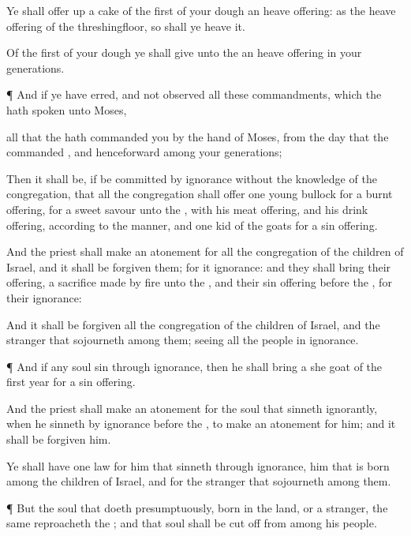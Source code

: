 {Ye shall offer
up a
cake of the
first of your
dough
{} an heave
offering: as
{} the heave
offering of the
threshingfloor, so shall ye
heave it.

Of the
first of your
dough ye shall
give unto the
{} an heave
offering in your
generations.


\par }{\PP {}¶ And if ye have
erred, and not
observed all these
commandments, which the
{} hath
spoken unto
Moses,

 all that the
{} hath
commanded you by the
hand of
Moses, from the
day that the
{}
commanded
{}, and
henceforward among your
generations;

Then it shall be, if
{} be
committed by
ignorance without the
knowledge of the
congregation, that all the
congregation shall
offer
one
young
bullock for a burnt
offering, for a
sweet
savour unto the
{}, with his meat
offering, and his drink
offering, according to the
manner, and
one
kid of the
goats for a sin
offering.

And the
priest shall make an
atonement for all the
congregation of the
children of
Israel, and it shall be
forgiven them; for it
{}
ignorance: and they shall
bring their
offering, a sacrifice made by
fire unto the
{}, and their sin
offering
before the
{}, for their
ignorance:

And it shall be
forgiven all the
congregation of the
children of
Israel, and the
stranger that
sojourneth
among them; seeing all the
people
{} in
ignorance.


\par }{\PP {}¶ And if
any
soul
sin through
ignorance, then he shall
bring a she
goat of the
first
year for a sin
offering.

And the
priest shall make an
atonement for the
soul that sinneth
ignorantly, when he
sinneth by
ignorance
before the
{}, to make an
atonement for him; and it shall be
forgiven him.

Ye shall have
one
law for him that
sinneth through
ignorance,
{} him that is
born among the
children of
Israel, and for the
stranger that
sojourneth
among them.


\par }{\PP {}¶ But the
soul that
doeth
{}
presumptuously,
{} born in the
land, or a
stranger, the same
reproacheth the
{}; and that
soul shall be cut
off from
among his
people.

}
